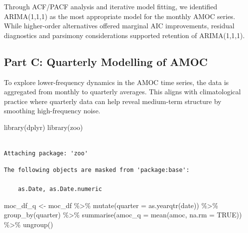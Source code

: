 \documentclass[
  11pt,
]{article}
\newenvironment{Shaded}{\begin{snugshade}}{\end{snugshade}}
\newcommand{\AttributeTok}[1]{\textcolor[rgb]{0.40,0.45,0.13}{#1}}
\newcommand{\ConstantTok}[1]{\textcolor[rgb]{0.56,0.35,0.01}{#1}}
\newcommand{\FunctionTok}[1]{\textcolor[rgb]{0.28,0.35,0.67}{#1}}
\newcommand{\NormalTok}[1]{\textcolor[rgb]{0.00,0.23,0.31}{#1}}
\newcommand{\OtherTok}[1]{\textcolor[rgb]{0.00,0.23,0.31}{#1}}
\newcommand{\SpecialCharTok}[1]{\textcolor[rgb]{0.37,0.37,0.37}{#1}}
\begin{document}
Through ACF/PACF analysis and iterative model fitting, we identified
ARIMA(1,1,1) as the most appropriate model for the monthly AMOC series.
While higher-order alternatives offered marginal AIC improvements,
residual diagnostics and parsimony considerations supported retention of
ARIMA(1,1,1).

\subsection{Part C: Quarterly Modelling of
AMOC}\label{part-c-quarterly-modelling-of-amoc}

To explore lower-frequency dynamics in the AMOC time series, the data is
aggregated from monthly to quarterly averages. This aligns with
climatological practice where quarterly data can help reveal medium-term
structure by smoothing high-frequency noise.

\begin{Shaded}
\begin{Highlighting}[]
\FunctionTok{library}\NormalTok{(dplyr)}
\FunctionTok{library}\NormalTok{(zoo)}
\end{Highlighting}
\end{Shaded}

\begin{verbatim}

Attaching package: 'zoo'
\end{verbatim}

\begin{verbatim}
The following objects are masked from 'package:base':

    as.Date, as.Date.numeric
\end{verbatim}

\begin{Shaded}
\begin{Highlighting}[]
\NormalTok{moc\_df\_q }\OtherTok{\textless{}{-}}\NormalTok{ moc\_df }\SpecialCharTok{\%\textgreater{}\%}
  \FunctionTok{mutate}\NormalTok{(}\AttributeTok{quarter =} \FunctionTok{as.yearqtr}\NormalTok{(date)) }\SpecialCharTok{\%\textgreater{}\%}
  \FunctionTok{group\_by}\NormalTok{(quarter) }\SpecialCharTok{\%\textgreater{}\%}
  \FunctionTok{summarise}\NormalTok{(}\AttributeTok{amoc\_q =} \FunctionTok{mean}\NormalTok{(amoc, }\AttributeTok{na.rm =} \ConstantTok{TRUE}\NormalTok{)) }\SpecialCharTok{\%\textgreater{}\%}
  \FunctionTok{ungroup}\NormalTok{()}
\end{Highlighting}
\end{Shaded}
\end{document}
